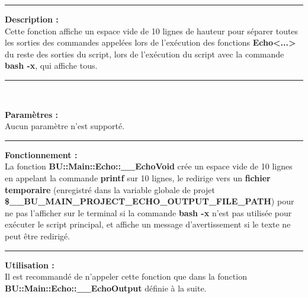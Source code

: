 \documentclass[a4paper,10pt]{article}
\begin{document}

\par\noindent\rule{\textwidth}{0.4pt}

\begin{justify}
    \textbf{Description :}\\[1\baselineskip]
    Cette fonction affiche un espace vide de 10 lignes de hauteur pour séparer toutes les sorties des commandes appelées lors de l'exécution des fonctions \textbf{\color{func}Echo<...>} du reste des sorties du script, lors de l'exécution du script avec la commande \textbf{\color{cmds}bash -x}, qui affiche tous.
\end{justify}


\par\noindent\rule{\textwidth}{0.4pt}\\

\begin{justify}
    \textbf{Paramètres :}\\[1\baselineskip]
    Aucun paramètre n'est supporté.
\end{justify}


\par\noindent\rule{\textwidth}{0.4pt}

\begin{justify}
    \textbf{Fonctionnement :}\\[1\baselineskip]
    La fonction \textbf{\color{func}BU::Main::Echo::\_\_EchoVoid} crée un espace vide de 10 lignes en appelant la commande \textbf{\color{cmds}printf} sur 10 lignes, le redirige vers un \textbf{\color{path}fichier temporaire} (enregistré dans la variable globale de projet \textbf{\color{vars}\$\_\_BU\_MAIN\_PROJECT\_ECHO\_OUTPUT\_FILE\_PATH}) pour ne pas l'afficher sur le terminal si la commande \textbf{\color{cmds}bash -x} n'est pas utilisée pour exécuter le script principal, et affiche un message d'avertissement si le texte ne peut être redirigé.
\end{justify}


\par\noindent\rule{\textwidth}{0.4pt}

\begin{justify}
    \textbf{Utilisation :}\\[1\baselineskip]
    Il est recommandé de n'appeler cette fonction que dans la fonction \textbf{\color{func}BU::Main::Echo::\_\_EchoOutput} définie à la suite.
\end{justify}
\end{document}
